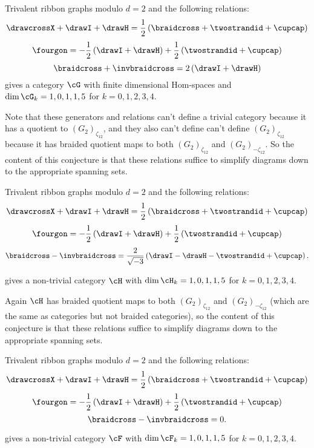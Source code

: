 \documentclass[12pt]{amsart}
\begin{document}
\begin{conjecture}
Trivalent ribbon graphs modulo $d=2$ and the following relations:
$$\drawcrossX + \drawI + \drawH = \frac{1}{2} \left(\braidcross + \twostrandid + \cupcap \right)$$
$$\fourgon = -\frac{1}{2} \left(\drawI + \drawH \right) + \frac{1}{2} \left(\twostrandid + \cupcap\right)$$
$$\braidcross + \invbraidcross = 2 \left(\drawI + \drawH \right)$$
gives a category $\cG$ with finite dimensional Hom-spaces and $\dim \cG_k = 1,0,1,1,5$ for $k = 0,1,2,3,4$.  
\end{conjecture}

Note that these generators and relations can't define a trivial category
because it has a quotient to  $(G_2)_{\zeta_{12}}$, and they also can't define
can't define $(G_2)_{\zeta_{12}}$ because it has braided quotient maps to both
$(G_2)_{\zeta_{12}}$ and $(G_2)_{-\zeta_{12}}$.  So the content of this conjecture
is that these relations suffice to simplify diagrams down to the appropriate
spanning sets.

\begin{conjecture}
Trivalent ribbon graphs modulo $d=2$ and the following relations:
$$\drawcrossX + \drawI + \drawH = \frac{1}{2} \left(\braidcross + \twostrandid + \cupcap \right)$$
$$\fourgon = -\frac{1}{2} \left(\drawI + \drawH \right) + \frac{1}{2} \left(\twostrandid + \cupcap\right)$$
$$\braidcross - \invbraidcross = \frac{2}{\sqrt{-3}} \left(\drawI - \drawH - \twostrandid + \cupcap\right).$$

gives a non-trivial category $\cH$ with $\dim \cH_k = 1,0,1,1,5$ for $k = 0,1,2,3,4$.  
\end{conjecture}

Again $\cH$ has braided quotient maps to both $(G_2)_{\zeta_{12}}$ and
$(G_2)_{-\zeta_{12}}$ (which are the same as categories but not braided
categories), so the content of this conjecture is that these relations suffice
to simplify diagrams down to the appropriate spanning sets.

\begin{conjecture}
Trivalent ribbon graphs modulo $d=2$ and the following relations:
$$\drawcrossX + \drawI + \drawH = \frac{1}{2} \left(\braidcross + \twostrandid + \cupcap \right)$$
$$\fourgon = -\frac{1}{2} \left(\drawI + \drawH \right) + \frac{1}{2} \left(\twostrandid + \cupcap\right)$$
$$\braidcross - \invbraidcross = 0.$$

gives a non-trivial category $\cF$ with $\dim \cF_k = 1,0,1,1,5$ for $k = 0,1,2,3,4$.
\end{conjecture}
\end{document}
